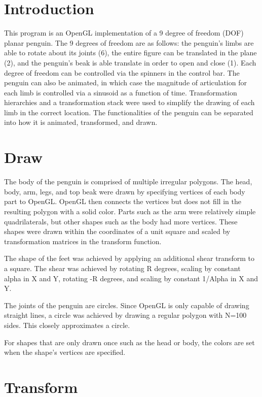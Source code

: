 \documentclass{scrartcl}
\begin{document}
\section{Introduction}


This program is an OpenGL implementation of a 9 degree of freedom (DOF) planar penguin. The 9 degrees of freedom are as follows: the penguin's limbs are able to rotate about its joints (6), the entire figure can be translated in the plane (2), and the penguin's beak is able translate in order to open and close (1). Each degree of freedom can be controlled via the spinners in the control bar. The penguin can also be animated, in which case the magnitude of articulation for each limb is controlled via a sinusoid as a function of time. Transformation hierarchies and a transformation stack were used to simplify the drawing of each limb in the correct location. The functionalities of the penguin can be separated into how it is animated, transformed, and drawn.

\section{Draw}


The body of the penguin is comprised of multiple irregular polygons. The head, body, arm, legs, and top beak were drawn by specifying vertices of each body part to OpenGL. OpenGL then connects the vertices but does not fill in the resulting polygon with a solid color. Parts such as the arm were relatively simple quadrilaterals, but other shapes such as the body had more vertices. These shapes were drawn within the coordinates of a unit square and scaled by transformation matrices in the transform function.

The shape of the feet was achieved by applying an additional shear transform to a square. The shear was achieved by rotating R degrees, scaling by constant alpha in X and Y, rotating -R degrees, and scaling by constant 1/Alpha in X and Y.

The joints of the penguin are circles. Since OpenGL is only capable of drawing straight lines, a circle was achieved by drawing a regular polygon with N=100 sides. This closely approximates a circle.

For shapes that are only drawn once such as the head or body, the colors are set when the shape's vertices are specified.

\section{Transform}
\end{document}
